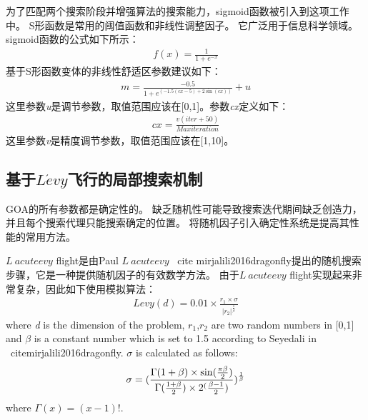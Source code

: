 为了匹配两个搜索阶段并增强算法的搜索能力，sigmoid函数被引入到这项工作中。 S形函数是常用的阈值函数和非线性调整因子。 它广泛用于信息科学领域。 sigmoid函数的公式如下所示：
\begin{eqnarray}
	f(x)=\frac{1}{1+e^{-x}}
\end{eqnarray}
基于S形函数变体的非线性舒适区参数建议如下：
\begin{eqnarray}
    m=\frac{-0.5}{1+e^{(-1.5(cx-5)+2\sin(cx))}}+u
\end{eqnarray}
这里参数\emph{u}是调节参数，取值范围应该在[0,1]。参数\emph{cx}定义如下：
\begin{eqnarray}
	cx=\frac{v(iter+50)}{Maxiteration}
\end{eqnarray}
这里参数\emph{v}是精度调节参数，取值范围应该在[1,10]。
\subsection{基于$L\acute{e}vy$飞行的局部搜索机制}
GOA的所有参数都是确定性的。 缺乏随机性可能导致搜索迭代期间缺乏创造力，并且每个搜索代理只能搜索确定的位置。 将随机因子引入确定性系统是提高其性能的常用方法。

$ L \ acute {e} vy $ flight是由Paul $ L \ acute {e} vy $ \ cite {mirjalili2016dragonfly}提出的随机搜索步骤，它是一种提供随机因子的有效数学方法。 由于$ L \ acute {e} vy $ flight实现起来非常复杂，因此如下使用模拟算法：
\begin{eqnarray}
	Levy(d)=0.01\times\frac{r_1\times\sigma}{|r_2|^{\frac{1}{\beta}}}
\end{eqnarray}
where \emph{d} is the dimension of the problem, $r_1$,$r_2$ are two random numbers in [0,1] and $\beta$ is a constant number which is set to 1.5 according to Seyedali in \ cite{mirjalili2016dragonfly}. $\sigma$ is calculated as follows:
\begin{eqnarray}
	\sigma=(\frac{\Gamma(1+\beta)\times \sin(\frac{\pi\beta}{2})}{\Gamma(\frac{1+\beta}{2})\time\beta\times2^(\frac{\beta-1}{2})})^\frac{1}{\beta}
\end{eqnarray}
where $\Gamma(x)=(x-1)!$.

